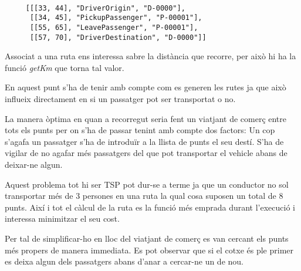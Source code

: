 \begin{verbatim}

     [[[33, 44], "DriverOrigin", "D-0000"],
      [[34, 45], "PickupPassenger", "P-00001"],
      [[55, 65], "LeavePassenger", "P-00001"],
      [[57, 70], "DriverDestination", "D-0000"]]
\end{verbatim}

Associat a una ruta ens interessa sabre la distància que recorre, per això hi ha la funció \emph{getKm}
que torna tal valor.

En aquest punt s'ha de tenir amb compte com es generen les rutes ja que això influeix directament en
si un passatger pot ser transportat o no.

La manera òptima en quan a recorregut seria fent un viatjant
de comerç entre tots els punts per on s'ha de passar tenint amb compte dos factors:
Un cop s'agafa un passatger s'ha de introduïr a la llista de punts el seu destí.
S'ha de vigilar de no agafar més passatgers del que pot transportar el vehicle
abans de deixar-ne algun.

Aquest problema tot hi ser TSP pot dur-se a terme ja que un conductor no sol transportar més de 3
persones en una ruta la qual cosa suposen un total de 8 punts. Així i tot el càlcul de la ruta
es la funció més emprada durant l'execució i interessa minimitzar el seu cost.

Per tal de simplificar-ho en lloc del viatjant de comerç es van cercant els punts més propers de
manera immediata. Es pot observar que si el cotxe és ple primer es deixa algun dels passatgers
abans d'anar a cercar-ne un de nou.

